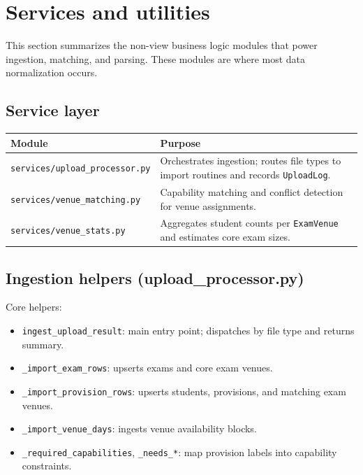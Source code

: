 \section{Services and utilities}
\label{sec:services}

This section summarizes the non-view business logic modules that power ingestion, matching, and parsing. These modules are where most data normalization occurs.

\subsection{Service layer}
\label{subsec:services:layer}

\begin{longtable}{p{}p{}}
\toprule
\textbf{Module} & \textbf{Purpose} \\
\midrule
\texttt{services/upload\_processor.py} & Orchestrates ingestion; routes file types to import routines and records \texttt{UploadLog}. \\
\texttt{services/venue\_matching.py} & Capability matching and conflict detection for venue assignments. \\
\texttt{services/venue\_stats.py} & Aggregates student counts per \texttt{ExamVenue} and estimates core exam sizes. \\
\bottomrule
\end{longtable}

\subsection{Ingestion helpers (upload\_processor.py)}
\label{subsec:services:upload}

Core helpers:

\begin{itemize}
  \item \texttt{ingest\_upload\_result}: main entry point; dispatches by file type and returns summary.
  \item \texttt{\_import\_exam\_rows}: upserts exams and core exam venues.
  \item \texttt{\_import\_provision\_rows}: upserts students, provisions, and matching exam venues.
  \item \texttt{\_import\_venue\_days}: ingests venue availability blocks.
  \item \texttt{\_required\_capabilities}, \texttt{\_needs\_*}: map provision labels into capability constraints.
\end{itemize}

